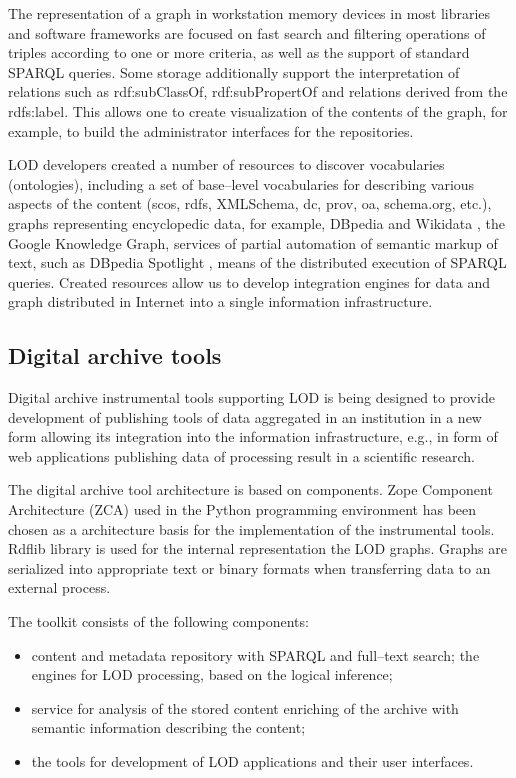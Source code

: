 \documentclass[12pt]{llncs}
\begin{document}
The representation of a graph in workstation memory devices in most
libraries and software frameworks are focused on fast search and
filtering operations of triples according to one or more criteria, as
well as the support of standard SPARQL queries. Some storage
additionally support the interpretation of relations such as
rdf:subClassOf, rdf:subPropertOf and relations derived from the
rdfs:label. This allows one to create visualization of the contents of
the graph, for example, to build the administrator interfaces for the
repositories.

LOD developers created a number of resources to discover vocabularies
(ontologies), including a set of base--level vocabularies for describing
various aspects of the content (scos, rdfs, XMLSchema, dc, prov, oa,
schema.org, etc.), graphs representing encyclopedic data, for example,
DBpedia \cite{b3} and Wikidata \cite{b4}, the Google Knowledge Graph,
services of partial automation of semantic markup of text, such as
DBpedia Spotlight \cite{b5}, means of the distributed execution of SPARQL
queries. Created resources allow us to develop integration engines for
data and graph distributed in Internet into a single information
infrastructure.

\subsection{Digital archive tools}

Digital archive instrumental tools supporting LOD is being designed to
provide development of publishing tools of data aggregated in an
institution in a new form allowing its integration into the information
infrastructure, e.g., in form of web applications publishing data of
processing result in a scientific research.

The digital archive tool architecture is based on components. Zope
Component Architecture (ZCA) \cite{b6} used in the Python programming
environment \cite{b7} has been chosen as a architecture basis for the
implementation of the instrumental tools. Rdflib library is used for the
internal representation the LOD graphs. Graphs are serialized into
appropriate text or binary formats when transferring data to an external
process.

The toolkit consists of the following components:

\begin{itemize}
\item
  content and metadata repository with SPARQL and full--text search; the
  engines for LOD processing, based on the logical inference;
\item
  service for analysis of the stored content enriching of the archive
  with semantic information describing the content;
\item
  the tools for development of LOD applications and their user
  interfaces.
\end{itemize}
\end{document}
